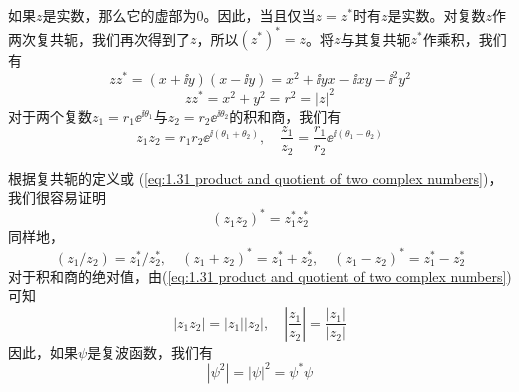 	如果$z$是实数，那么它的虚部为0。因此，当且仅当$z = z^{\ast}$时有$z$是实数。对复数$z$作两次复共轭，我们再次得到了$z$，所以$\left(z^{\ast}\right)^{\ast}=z$。将$z$与其复共轭$z^{\ast}$作乘积，我们有
	\begin{equation*}
		zz^{\ast} = \left(x + \ii y\right)\left(x - \ii y\right) = x^2+\ii yx-\ii xy-\ii^2y^2
	\end{equation*}
	\begin{equation}
		\boxed{zz^{\ast} = x^2+y^2=r^2=\left|z\right|^2}
		\label{eq:1.30 product of z and its complex conjugate}
	\end{equation}
	对于两个复数$z_1=r_1\ee^{\ii\theta_1}$与$z_2 = r_2\ee^{\ii\theta_2}$的积和商，我们有
	\begin{equation}
		z_1z_2 = r_1r_2\ee^{\ii\left(\theta_1+\theta_2\right)}, \quad \frac{z_1}{z_2} = \frac{r_1}{r_2}\ee^{\ii \left(\theta_1 - \theta_2\right)}
		\label{eq:1.31 product and quotient of two complex numbers}
	\end{equation}

	根据复共轭的定义或 (\ref{eq:1.31 product and quotient of two complex numbers})，我们很容易证明
	\begin{equation}
		\boxed{\left(z_1z_2\right)^{\ast} = z_1^{\ast} z_2^{\ast}}
		\label{eq:1.32 properties of complex conjugate}
	\end{equation}
	同样地，
	\begin{equation}
		\boxed{
				\left(z_1/z_2\right) = z_1^{\ast} / z_2^{\ast}, \quad \left(z_1+z_2\right)^{\ast} = z_1^{\ast} + z_2^{\ast} , \quad \left(z_1-z_2\right)^{\ast} = z_1^{\ast} - z_2^{\ast}}
		\label{eq:1.33 linear properties of complex conjugate
		}
	\end{equation}
	对于积和商的绝对值，由(\ref{eq:1.31 product and quotient of two complex numbers})可知
	\begin{equation}
		\left|z_1z_2\right|=\left|z_1\right|\left|z_2\right|, \quad \left|\frac{z_1}{z_2}\right| = \frac{\left|z_1\right|}{\left|z_2\right|}
		\label{eq:1.34 properties of product and quotient absolute values}
	\end{equation}
	因此，如果$\psi$是复波函数，我们有
	\begin{equation}
		\left|\psi^2\right| = \left|\psi\right|^2 = \psi^{\ast} \psi
		\label{eq:1.35 properties of psi wave function}
	\end{equation}

